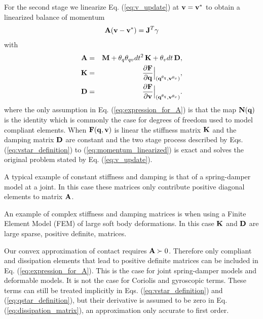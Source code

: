 For the second stage we linearize Eq. (\ref{eq:v_update})
at ${\mathbf{v}} = {\mathbf{v}}^*$ to obtain a linearized balance of momentum
\begin{eqnarray}
	\mf{A}(\mf{v}-\mf{v}^*)= \mf{J}^T\mf{\gamma}
	\label{eq:momentum_linearized}
\end{eqnarray}
with
\begin{eqnarray}
	\mf{A}&=&\mf{M}+\theta_q\theta_{qv} dt^2\,\mf{K}+\theta_v dt\,\mf{D},
	\label{eq:expression_for_A}\\
	\mf{K}&=&\frac{\partial \mf{F}}{\partial \mf{q}}\Bigr|_{(\mf{q}^{\theta_q}, \mf{v}^{\theta_v})},\\
	\mf{D}&=&\frac{\partial \mf{F}}{\partial \mf{v}}\Bigr|_{(\mf{q}^{\theta_q},
	\mf{v}^{\theta_v})}.
	\label{eq:dissipation_matrix}
\end{eqnarray}
where the only assumption in Eq. (\ref{eq:expression_for_A}) is that the map
${\mathbf{N}}({\mathbf{q}})$ is the identity  which is commonly the case for degrees of freedom
used to model compliant elements. When ${\mathbf{F}}({\mathbf{q}}, {\mathbf{v}})$ is linear the
stiffness matrix ${\mathbf{K}}$ and the damping matrix ${\mathbf{D}}$ are constant and the
two stage process described by Eqs. (\ref{eq:vstar_definition}) to
(\ref{eq:momentum_linearized}) is exact and solves the original problem stated
by Eq. (\ref{eq:v_update}).


A typical example of constant stiffness and damping is that of a spring-damper
model at a joint. In this case these matrices only contribute positive diagonal
elements to matrix ${\mathbf{A}}$.

An example of complex stiffness and damping matrices is when using a Finite
Element Model (FEM) of large soft body deformations. In this case ${\mathbf{K}}$ and
${\mathbf{D}}$ are large sparse, positive definite, matrices.

Our convex approximation of contact requires ${\mathbf{A}}\succ 0$. Therefore only
compliant and dissipation elements that lead to positive definite matrices can
be included in Eq. (\ref{eq:expression_for_A}). This is the case for joint
spring-damper models and deformable models. It is not the case for Coriolis and
gyroscopic terms. These terms can still be treated implicitly in Eqs.
(\ref{eq:vstar_definition}) and (\ref{eq:qstar_definition}), but their
derivative is assumed to be zero in Eq. (\ref{eq:dissipation_matrix}), an
approximation only accurate to first order. 

